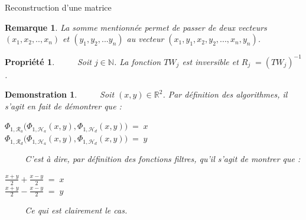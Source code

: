 \documentclass[a4paper,10pt]{report}
\theoremstyle{break}
\newtheorem{Prop}{Propri\'{e}t\'{e}}
\newtheorem{Rem}{Remarque}
\newtheorem{Dem}{Demonstration}
\begin{document}
    \begin{algorithm}
      \caption{Reconstruction d'une matrice}
      
      \begin{algorithmic}
	  \ENDFOR
	  \ENDFOR
	\ENDFOR
      \end{algorithmic}

    \end{algorithm}
    
    \begin{Rem}
      La somme mentionn\'{e}e permet de passer de deux vecteurs $(x_1, x_2, .., x_n)$ et $(y_1, y_2, ... y_n)$ 
      au vecteur $(x_1, y_1, x_2, y_2, ..., x_n, y_n)$.
    \end{Rem}

    
    \begin{Prop}
      $\phantom{Prop}$ Soit $j \in \mathbb{N}$. La fonction $TW_j$ est inversible et $R_j \; = (TW_j)^{-1}$.
    \end{Prop}
    
    \begin{Dem}
      $\phantom{Prop}$ Soit $(x, y) \in \mathbb{R}^2$.
      Par d\'{e}finition des algorithmes, il s'agit en fait de d\'{e}montrer que :
      
      \begin{center}
	$ \Phi_{1, \mathcal{R}_a} \Big(\Phi_{1, \mathcal{H}_a}(x, y), \Phi_{1, \mathcal{H}_d}(x, y) \Big) \; = \; x $ \\
	$ \Phi_{1, \mathcal{R}_d} \Big(\Phi_{1, \mathcal{H}_a}(x, y), \Phi_{1, \mathcal{H}_d}(x, y) \Big) \; = \; y $
      \end{center}
      
      $\phantom{Prop}$ C'est \`{a} dire, par d\'{e}finition des fonctions filtres, qu'il s'agit de montrer que :
      
      \begin{center}
	$ \frac{x + y}{2} + \frac{x - y}{2} \; = \; x $ \\
	$ \frac{x + y}{2} - \frac{x - y}{2} \; = \; y $
      \end{center}
      
      $\phantom{Prop}$ Ce qui est clairement le cas.

    \end{Dem}
\end{document}
